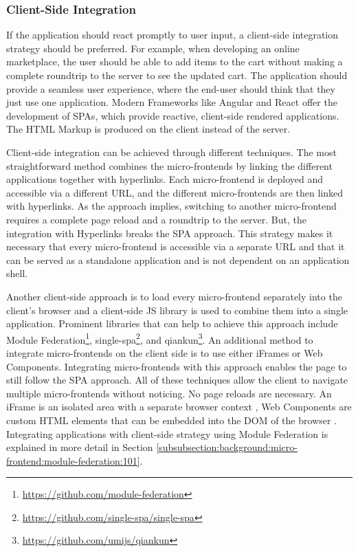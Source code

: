 \subsubsection{Client-Side Integration}\label{subsubsection:background:micro-frontend-architecture:integration-strategies:client-side-integration}

If the application should react promptly to user input, a client-side integration strategy should be preferred. For example, when developing an online marketplace, the user should be able to add items to the cart without making a complete roundtrip to the server to see the updated cart. The application should provide a seamless user experience, where the end-user should think that they just use one application. Modern Frameworks like Angular and React offer the development of \acp{SPA}, which provide reactive, client-side rendered applications. The \ac{HTML} Markup is produced on the client instead of the server. \cite{book:2020:geers:background:micro-frontends:micro-frontends-in-action}

\bigskip

\noindent Client-side integration can be achieved through different techniques. The most straightforward method combines the micro-frontends by linking the different applications together with hyperlinks. Each micro-frontend is deployed and accessible via a different \ac{URL}, and the different micro-frontends are then linked with hyperlinks. As the approach implies, switching to another micro-frontend requires a complete page reload and a roundtrip to the server. But, the integration with Hyperlinks breaks the \ac{SPA} approach. This strategy makes it necessary that every micro-frontend is accessible via a separate \ac{URL} and that it can be served as a standalone application and is not dependent on an application shell.

\bigskip

\noindent Another client-side approach is to load every micro-frontend separately into the client's browser and a client-side \ac{JS} library is used to combine them into a single application. Prominent libraries that can help to achieve this approach include Module Federation\footnote{\url{https://github.com/module-federation}}, single-spa\footnote{\url{https://github.com/single-spa/single-spa}}, and qiankun\footnote{\url{https://github.com/umijs/qiankun}}. An additional method to integrate micro-frontends on the client side is to use either iFrames or Web Components. Integrating micro-frontends with this approach enables the page to still follow the \ac{SPA} approach. All of these techniques allow the client to navigate multiple micro-frontends without noticing. No page reloads are necessary. An iFrame is an isolated area with a separate browser context \cite[35]{book:2020:geers:background:micro-frontends:micro-frontends-in-action}, Web Components are custom \ac{HTML} elements that can be embedded into the \ac{DOM} of the browser \cite[103]{book:2019:farrell:background:micro-frontends:web-components-in-action}. Integrating applications with client-side strategy using Module Federation is explained in more detail in Section \ref{subsubsection:background:micro-frontend:module-federation:101}.
